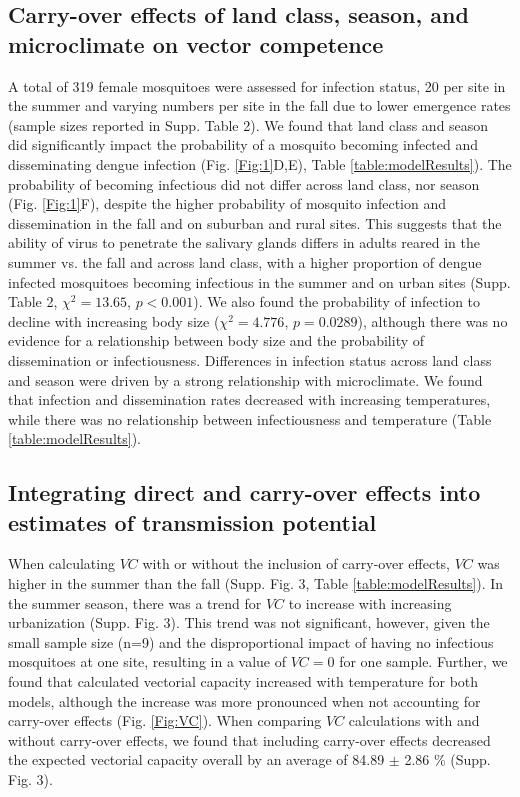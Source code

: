 \documentclass[12pt]{article}
\begin{document}
\subsection{Carry-over effects of land class, season, and microclimate on vector competence}

A total of 319 female mosquitoes were assessed for infection status, 20 per site in the summer and varying numbers per site in the fall due to lower emergence rates (sample sizes reported in Supp. Table 2). We found that land class and season did significantly impact the probability of a mosquito becoming infected and disseminating dengue infection (Fig. \ref{Fig:1}D,E), Table \ref{table:modelResults}). The probability of becoming infectious did not differ across land class, nor season (Fig. \ref{Fig:1}F), despite the higher probability of mosquito infection and dissemination in the fall and on suburban and rural sites. This suggests that the ability of virus to penetrate the salivary glands differs in adults reared in the summer vs. the fall and across land class, with a higher proportion of dengue infected mosquitoes becoming infectious in the summer and on urban sites (Supp. Table 2, $\chi^2=13.65$, $p<0.001$). We also found the probability of infection to decline with increasing body size ($\chi^2=4.776$, $p=0.0289$), although there was no evidence for a relationship between body size and the probability of dissemination or infectiousness. Differences in infection status across land class and season were driven by a strong relationship with microclimate. We found that infection and dissemination rates decreased with increasing temperatures, while there was no relationship between infectiousness and temperature (Table \ref{table:modelResults}).

\subsection{Integrating direct and carry-over effects into estimates of transmission potential}

When calculating $VC$ with or without the inclusion of carry-over effects, $VC$ was higher in the summer than the fall (Supp. Fig. 3, Table \ref{table:modelResults}). In the summer season, there was a trend for $VC$ to increase with increasing urbanization (Supp. Fig. 3). This trend was not significant, however, given the small sample size (n=9) and the disproportional impact of having no infectious mosquitoes at one site, resulting in a value of $VC=0$ for one sample. Further, we found that calculated vectorial capacity increased with temperature for both models, although the increase was more pronounced when not accounting for carry-over effects (Fig. \ref{Fig:VC}). When comparing $VC$ calculations with and without carry-over effects, we found that including carry-over effects decreased the expected vectorial capacity overall by an average of 84.89 $\pm$ 2.86 \% (Supp. Fig. 3).
\end{document}
